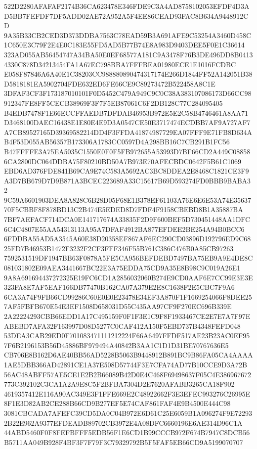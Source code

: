 \documentclass[UTF8,fontset=fandol,zihao=-4,a4paper]{ctexart}
\begin{document}
{{522D2280AFAFAF2174B36CA623478E346FDE9C3A4AD8758102053EFDF4D3AD5BB7FEFDF7DF5ADD02AE72A952A5F4EE86CEAD93FAC8B634A9448912CD
9A35B33CB2CED3D373DDBA7563C78EAD59B3A691AFE9C53254A3460D458C1C650E3C79F2E4E0C183E55FD5AD5B77B74E8A983D9403DEE5F0E1C36614
323AD055AB56454747A34BA50E0EF68577A181C9A3478F76B3DE496DD8B04134330C878D34213454FA1A67EC798BBA7FFFBEA01980ECE1E1016FCDBC
E058F87846A6A40E1C38203CC988880890474317174E266D1844FF52A142051B38D5818181EA5902704FDE632ED6FE66CE9C89273472B522458A8C1E
3DFAF3CF3F173187010101F0D5452C479A949C9C0C38A383107086173D66CC98912347FE8FF5CECB38969F3F7F5EB87061C6F2DB128C77C284095405
B4EDB7478F1E66ECCFFAEDB7DFDAB46953B972E5E2C58B4746461A8AA71D3468100DAEC16438E1E80E4E9D3A0547CE50E3717474ECDBB7AF9A727AF7
A7CB89527165D39369582214DD4F3FFDA41874987729EA07FFF9E71FB8D634AB4F53D055AB56357B173306A1783CC0597D4A298BB16C7CB291B1FC56
B47FFFFE3A75EA5035C1550E0F0F5FB972655A53993D7BF66CD2A449C088586CA2800DC064DDBA75F80210BD50A7B973E70AFECBDC0642F5B61C1069
EBD6AD376FDE841B69CA9E74C583A5692AC3BC8DDEA2E8468C1821CE3F9A3D7BB679D7D9B871A3BCEC223689A33C15617B69D593274FD0BBB9BABA32
9C59A6601903DEA8A828C6B28D05F68E1B378EF61103A76E6E6E53A74E3563770F5CBBF8F878BD13C2B474E5EDED8D7FDF4F9158CBEBD8B1A35887BA
7BF7AEFACF714DCA0E141717674A33835F2D9F600BEF5D730451448AA1DFC6C4C4807E55AA54313113A95A7DFAF4912BA877EFDEE2BE254A94B0BCC6
6FDDBA55AD5A3545A60E38D20358EF867AF6EC290CD03896D192796ED9C6825FD7B46953B1472F3232F2CF3FFF346F55B761C386C476B0A85CB97263
7592531519DF1947BB63F0878A5FE5CA956BEFDEBD7497BA75EB9A9E4DE8C081031802E09AEA3441667BC22E3A75EDDA75CD9A35E8B98C9C019A26E1
9A8A691694437272325E19FC6CD1A2856032060B274E9CD0AAF6E7CC99E3E3E323FA8E7AF5EAF166DB77470B162CA07A379E2E8C1638F2E5CBC7F9A6
6CA3A74F9FB66CD99286C60E0E0E23478E34EF3A870F1F1669254066F8DEE257AF5FBFB670E54E3EF1508D658031D55C435AA97CF9F270EC696B339E
2A22224293CBB66EDD1A17C495159F0F1F3E1C9F8F1933467CE2E7E7A7F97EABEBD7AFA32F163997D08D5277C0CAF412A150F5EBD737B4348FEFD048
53DEA3CAB29ED0F701083471111212224F66A6497FFDF517AE23B23AC0EF957F6B2196153B56D45886BF979494A40842B3AA1C1D1D31BE70767636E5
CB706E8B162D6AE40BB56AD5228B5063B9448912B891BC9B86FA05CA4AAAA1AE5DBB366AD42891CE1A37E508D57744F3E7CFA74AD77B10CCE9D3A72B
56AC48ABFF57AE5CE1E2B2B66089B42D0E4C468F69498637F05C4E386967672773C392102C3CA1A2A9E8C5F2BFBA7304D2E7620AFABB3265CA18F902
4619357412E116A90AC349E3F1FFE669E2C48922662F3E3EFEC993276C26995E8F1E3D82AB2CE288B66CD9B277EF5E74CAF861FAF4E9B4500E444C98
3081CBCADA7AFEFC39CD5DA0C04B972E6D61C25E6059B1A096274F9E722932B22E962A9377EFDEADB89702CB3972E4A08DFC6660196E6AE314D96C1A
44ABD5460F0F8FEFBFFF5EDB56F1E6CD1B99CCCB972F674B7947C8DCB56B5711AA049B928F4BF3F7F79F3C79329792B5F5FAF5EB66CD9A5199070707
}}
\end{document}

